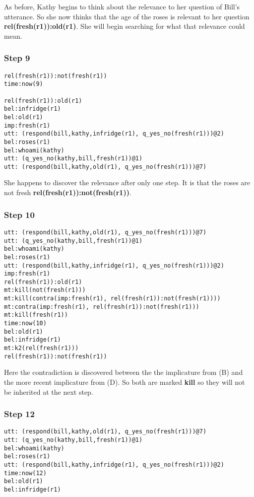 \documentclass{article}
\begin{document}
As before, Kathy begins to think about the relevance to her question of Bill's
utterance. So she now thinks that the age of the roses is relevant to her
question {\bf rel(fresh(r1)):old(r1)}. She will begin searching for what that
relevance could mean.

\subsubsection{Step 9}

\begin{verbatim}
rel(fresh(r1)):not(fresh(r1))
time:now(9)

rel(fresh(r1)):old(r1)
bel:infridge(r1)
bel:old(r1)
imp:fresh(r1)
utt: (respond(bill,kathy,infridge(r1), q_yes_no(fresh(r1)))@2)
bel:roses(r1)
bel:whoami(kathy)
utt: (q_yes_no(kathy,bill,fresh(r1))@1)
utt: (respond(bill,kathy,old(r1), q_yes_no(fresh(r1)))@7)
\end{verbatim}

She happens to discover the relevance after only one step. It is that the roses
are not fresh {\bf rel(fresh(r1)):not(fresh(r1))}.

\subsubsection{Step 10}

\begin{verbatim}
utt: (respond(bill,kathy,old(r1), q_yes_no(fresh(r1)))@7)
utt: (q_yes_no(kathy,bill,fresh(r1))@1)
bel:whoami(kathy)
bel:roses(r1)
utt: (respond(bill,kathy,infridge(r1), q_yes_no(fresh(r1)))@2)
imp:fresh(r1)
rel(fresh(r1)):old(r1)
mt:kill(not(fresh(r1)))
mt:kill(contra(imp:fresh(r1), rel(fresh(r1)):not(fresh(r1))))
mt:contra(imp:fresh(r1), rel(fresh(r1)):not(fresh(r1)))
mt:kill(fresh(r1))
time:now(10)
bel:old(r1)
bel:infridge(r1)
mt:k2(rel(fresh(r1)))
rel(fresh(r1)):not(fresh(r1))
\end{verbatim}          

Here the contradiction is discovered between the the implicature from
(B) and the more recent implicature from (D). So both are marked {\bf
kill} so they will not be inherited at the next step.
                                
\subsubsection{Step 12}

\begin{verbatim}
utt: (respond(bill,kathy,old(r1), q_yes_no(fresh(r1)))@7)
utt: (q_yes_no(kathy,bill,fresh(r1))@1)
bel:whoami(kathy)
bel:roses(r1)
utt: (respond(bill,kathy,infridge(r1), q_yes_no(fresh(r1)))@2)
time:now(12)
bel:old(r1)
bel:infridge(r1)
\end{verbatim}
\end{document}

